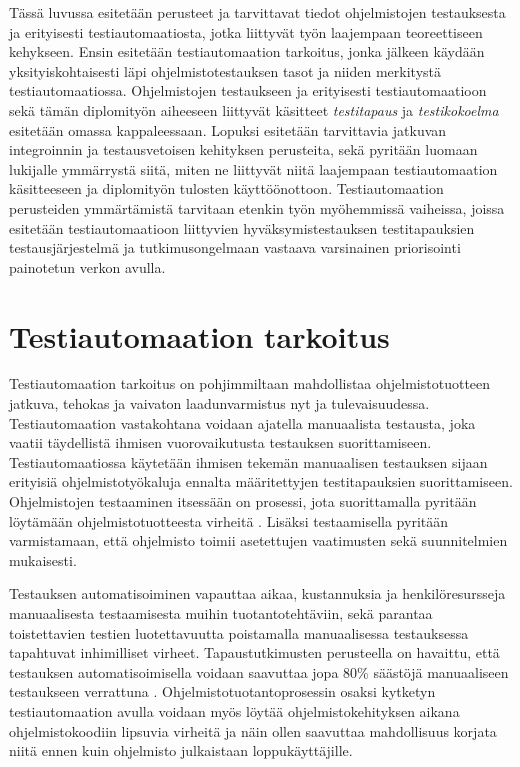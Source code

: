 Tässä luvussa esitetään perusteet ja tarvittavat tiedot ohjelmistojen testauksesta ja erityisesti testiautomaatiosta, jotka liittyvät työn laajempaan teoreettiseen kehykseen.
Ensin esitetään testiautomaation tarkoitus, jonka jälkeen käydään yksityiskohtaisesti läpi ohjelmistotestauksen tasot ja niiden merkitystä testiautomaatiossa.
Ohjelmistojen testaukseen ja erityisesti testiautomaatioon sekä tämän diplomityön aiheeseen liittyvät käsitteet \emph{testitapaus} ja \emph{testikokoelma} esitetään omassa kappaleessaan.
Lopuksi esitetään tarvittavia jatkuvan integroinnin ja testausvetoisen kehityksen perusteita, sekä pyritään luomaan lukijalle ymmärrystä siitä, miten ne liittyvät niitä laajempaan testiautomaation käsitteeseen ja diplomityön tulosten käyttöönottoon.
Testiautomaation perusteiden ymmärtämistä tarvitaan etenkin työn myöhemmissä vaiheissa, joissa esitetään testiautomaatioon liittyvien hyväksymistestauksen testitapauksien testausjärjestelmä ja tutkimusongelmaan vastaava varsinainen priorisointi painotetun verkon avulla.

\section{Testiautomaation tarkoitus} \label{ch:07_testiautomaation_tarkoitus}

  Testiautomaation tarkoitus on pohjimmiltaan mahdollistaa ohjelmistotuotteen jatkuva, tehokas ja vaivaton laadunvarmistus nyt ja tulevaisuudessa.
  Testiautomaation vastakohtana voidaan ajatella manuaalista testausta, joka vaatii täydellistä ihmisen vuorovaikutusta testauksen suorittamiseen.
  Testiautomaatiossa käytetään ihmisen tekemän manuaalisen testauksen sijaan erityisiä ohjelmistotyökaluja ennalta määritettyjen testitapauksien suorittamiseen.
  Ohjelmistojen testaaminen itsessään on prosessi, jota suorittamalla pyritään löytämään ohjelmistotuotteesta virheitä  \cite[s.~11]{the_art_of_software_testing_book}.
  Lisäksi testaamisella pyritään varmistamaan, että ohjelmisto toimii asetettujen vaatimusten sekä suunnitelmien mukaisesti.

  Testauksen automatisoiminen vapauttaa aikaa, kustannuksia ja henkilöresursseja manuaalisesta testaamisesta muihin tuotantotehtäviin, sekä parantaa toistettavien testien luotettavuutta poistamalla manuaalisessa testauksessa tapahtuvat inhimilliset virheet.
  Tapaustutkimusten perusteella on havaittu, että testauksen automatisoimisella voidaan saavuttaa jopa 80\% säästöjä manuaaliseen testaukseen verrattuna \cite[s.~3]{software_test_automation_book}.
  Ohjelmistotuotantoprosessin osaksi kytketyn testiautomaation avulla voidaan myös löytää ohjelmistokehityksen aikana ohjelmistokoodiin lipsuvia virheitä ja näin ollen saavuttaa mahdollisuus korjata niitä ennen kuin ohjelmisto julkaistaan loppukäyttäjille.

